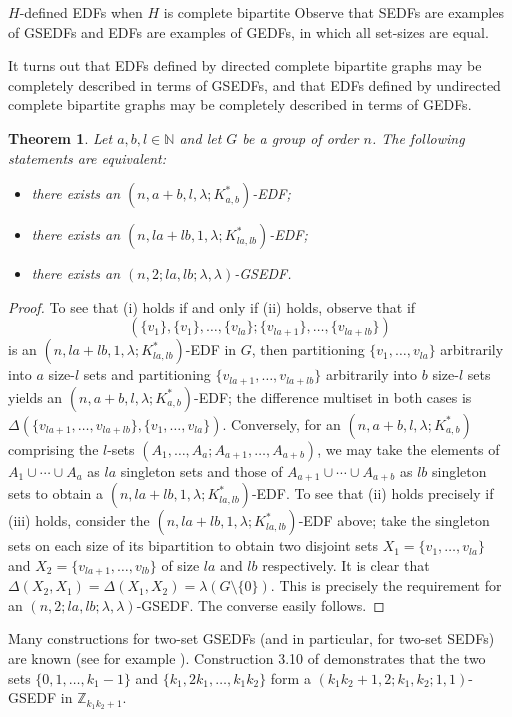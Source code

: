 \documentclass[12pt, a4paper]{article}
\newtheorem{theorem}{Theorem}[section]
\theoremstyle{definition}
\begin{document}
\begin{section}{$H$-defined EDFs when $H$ is complete bipartite}
Observe that SEDFs are examples of GSEDFs and EDFs are examples of GEDFs, in which all set-sizes are equal.


It turns out that EDFs defined by directed complete bipartite graphs may be completely described in terms of GSEDFs, and that EDFs defined by undirected complete bipartite graphs may be completely described in terms of GEDFs.

\begin{theorem}\label{thm:justGSEDF} Let $a,b,l \in \mathbb{N}$ and let $G$ be a group of order $n$.  The following statements are equivalent:
\begin{itemize}
\item[(i)] there exists an $(n,a+b,l,\lambda; K_{a,b}^*)$-EDF;
\item[(ii)] there exists an $(n, la+lb,1,\lambda; K_{la,lb}^*)$-EDF;
\item[(iii)] there exists an $(n,2;la,lb;\lambda,\lambda)$-GSEDF.
\end{itemize}
\end{theorem}
\begin{proof}
To see that (i) holds if and only if (ii) holds, observe that if
$$(\{v_1\}, \{v_1\}, \ldots, \{v_{la}\}; \{v_{la+1}\}, \ldots, \{v_{la+lb}\})$$
is an $(n, la+lb,1,\lambda; K_{la,lb}^*)$-EDF in $G$, then partitioning $\{v_1,\ldots, v_{la}\}$ arbitrarily into $a$ size-$l$ sets and partitioning $\{v_{la+1},\ldots, v_{la+lb}\}$ arbitrarily into $b$ size-$l$ sets yields an $(n,a+b,l,\lambda; K_{a,b}^*)$-EDF; the difference multiset in both cases is 
$\Delta(\{v_{la+1},\ldots,v_{la+lb}\},\{v_1,\ldots,v_{la}\})$. Conversely, for an $(n,a+b,l,\lambda; K_{a,b}^*)$ comprising the $l$-sets $(A_1,\ldots,A_{a}; A_{a+1},\ldots,A_{a+b})$, we may take the elements of $A_1 \cup \cdots \cup A_{a}$ as $la$ singleton sets and those of $A_{a+1} \cup \cdots \cup A_{a+b}$ as $lb$ singleton sets to obtain a  $(n, la+lb,1,\lambda; K_{la,lb}^*)$-EDF.
To see that (ii) holds precisely if (iii) holds, consider the $(n, la+lb,1,\lambda; K_{la,lb}^*)$-EDF above; take the singleton sets on each size of its bipartition to obtain two disjoint sets $X_1=\{v_1,\ldots,v_{la}\}$ and $X_2=\{v_{la+1},\ldots, v_{lb}\}$ of size $la$ and $lb$ respectively.  It is clear that $\Delta(X_2,X_1)=\Delta(X_1,X_2)=\lambda(G \setminus \{0\})$. This is precisely the requirement for an $(n,2;la,lb;\lambda,\lambda)$-GSEDF.  The converse easily follows.
\end{proof}


Many constructions for two-set GSEDFs (and in particular, for two-set SEDFs) are known (see for example \cite{HucPatWEDF,JedLi, Wenetal}). Construction 3.10 of \cite{HucPatWEDF} demonstrates that the two sets $\{0,1,\ldots,k_1-1\}$ and $\{k_1, 2k_1,\ldots,k_1 k_2\}$ form a $(k_1 k_2+1,2;k_1,k_2;1,1)$-GSEDF  in $\mathbb{Z}_{k_1 k_2+1}$.


\end{section}
\end{document}
